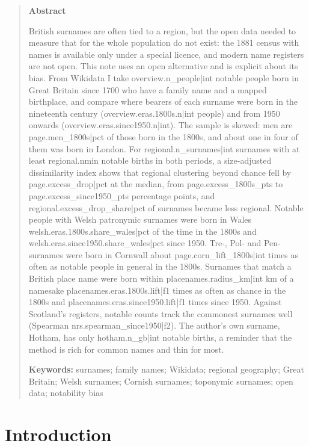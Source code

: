 \documentclass[11pt,a4paper]{article}
\begin{document}
\begin{quote}
\small
\begin{center}\textbf{Abstract}\end{center}
British surnames are often tied to a region, but the open data needed to measure that for the whole population do not exist: the 1881 census with names is available only under a special licence, and modern name registers are not open. This note uses an open alternative and is explicit about its bias. From Wikidata I take {{overview.n_people|int}} notable people born in Great Britain since 1700 who have a family name and a mapped birthplace, and compare where bearers of each surname were born in the nineteenth century ({{overview.eras.1800s.n|int}} people) and from 1950 onwards ({{overview.eras.since1950.n|int}}). The sample is skewed: men are {{page.men_1800s|pct}} of those born in the 1800s, and about one in four of them was born in London. For {{regional.n_surnames|int}} surnames with at least {{regional.nmin}} notable births in both periods, a size-adjusted dissimilarity index shows that regional clustering beyond chance fell by {{page.excess_drop|pct}} at the median, from {{page.excess_1800s_pts}} to {{page.excess_since1950_pts}} percentage points, and {{regional.excess_drop_share|pct}} of surnames became less regional. Notable people with Welsh patronymic surnames were born in Wales {{welsh.eras.1800s.share_wales|pct}} of the time in the 1800s and {{welsh.eras.since1950.share_wales|pct}} since 1950. Tre-, Pol- and Pen- surnames were born in Cornwall about {{page.corn_lift_1800s|int}} times as often as notable people in general in the 1800s. Surnames that match a British place name were born within {{placenames.radius_km|int}} km of a namesake {{placenames.eras.1800s.lift|f1}} times as often as chance in the 1800s and {{placenames.eras.since1950.lift|f1}} times since 1950. Against Scotland's registers, notable counts track the commonest surnames well (Spearman {{nrs.spearman_since1950|f2}}). The author's own surname, Hotham, has only {{hotham.n_gb|int}} notable births, a reminder that the method is rich for common names and thin for most.

\textbf{Keywords:} surnames; family names; Wikidata; regional geography; Great Britain; Welsh surnames; Cornish surnames; toponymic surnames; open data; notability bias
\end{quote}

\section{Introduction}
\end{document}
